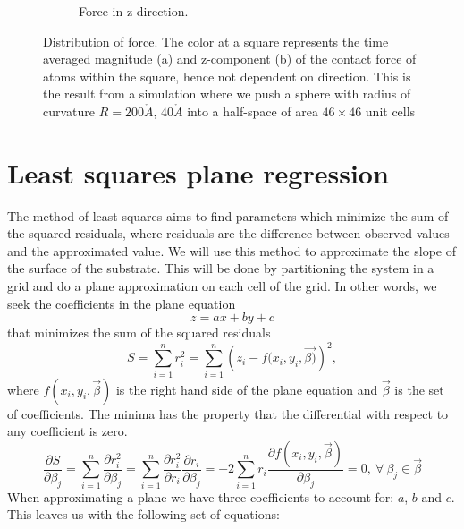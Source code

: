 \documentclass[twoside,english]{uiofysmaster}
\newcommand\lr[1]{\left(#1\right)}
\begin{document}
\begin{figure}[H]
\begin{subfigure}{0.49\textwidth}
		\vspace{-7mm}
		\caption{Force in z-direction.}
		\label{fig:zForceDistribution}
	\end{subfigure}
	\vspace*{5mm}
	\caption{Distribution of force. The color at a square represents the time averaged magnitude (a) and z-component (b) of the contact force of atoms within the square, hence not dependent on direction.
		This is the result from a simulation where we push a sphere with radius of curvature $R=200\mathring{A}$, $40\mathring{A}$ into a half-space of area $46\times46$ unit cells}
	\label{fig:forceDistributions}
\end{figure}


\section{Least squares plane regression} \label{sec:leastSquareRegression}
The method of least squares aims to find parameters which  minimize the sum of the squared residuals, where residuals are the difference between observed values and the approximated value. We will use this method to approximate the slope of the surface of the substrate. This will be done by partitioning the system in a grid and do a plane approximation on each cell of the grid. In other words, we seek the coefficients in the plane equation
\begin{equation}
	z = ax + by + c
	\label{planeEquation}
\end{equation}
that minimizes the sum of the squared residuals
\begin{equation}
	S = \sum_{i=1}^{n} r_i^2 = \sum_{i=1}^{n} \lr{z_i - f(x_i, y_i, \vec{\beta)}}^2,
	\label{leastSquaresPlane}
\end{equation}
where $f(x_i,y_i,\vec{\beta})$ is the right hand side of the plane equation and $\vec{\beta}$ is the set of coefficients.
The minima has the property that the differential with respect to any coefficient is zero. 
\begin{equation}
	\frac{\partial S}{\partial \beta_j} 
	=  \sum_{i=1}^{n}\frac{\partial r_i^2}{\partial \beta_j} 
	=  \sum_{i=1}^{n}\frac{\partial r_i^2}{\partial r_i} \frac{\partial r_i}{\partial \beta_j} 
	= -2 \sum_{i=1}^{n}r_i\frac{\partial f(x_i,y_i, \vec{\beta})}{\partial \beta_j}
	= 0 , ~\forall ~\beta_j \in \vec{\beta}
\end{equation}
When approximating a plane we have three coefficients to account for: $a$, $b$ and $c$. This leaves us with the following set of equations:
\end{document}
